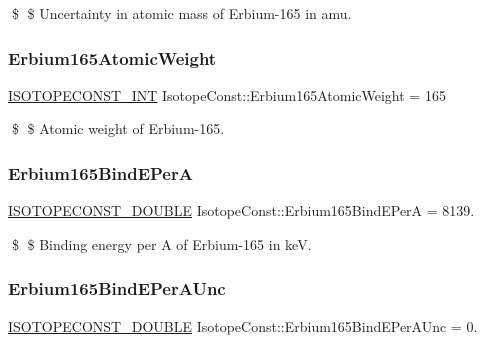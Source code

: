 \$ \$ Uncertainty in atomic mass of Erbium-\/165 in amu. \mbox{\label{group___isotope_const-_erbium-_er165_gadcf315375c63e2ed3c7d562bd5bca902}} 
\subsubsection{\texorpdfstring{Erbium165\+Atomic\+Weight}{Erbium165AtomicWeight}}
{\footnotesize\ttfamily \mbox{\hyperlink{group___isotope_const-_macros_ga5f18360b3e99483a35c32d789e62621c}{I\+S\+O\+T\+O\+P\+E\+C\+O\+N\+S\+T\+\_\+\+I\+NT}} Isotope\+Const\+::\+Erbium165\+Atomic\+Weight = 165}

\$ \$ Atomic weight of Erbium-\/165. \mbox{\label{group___isotope_const-_erbium-_er165_gae482f8321cd73b9d0878221c4cbd75b3}} 
\subsubsection{\texorpdfstring{Erbium165\+Bind\+E\+PerA}{Erbium165BindEPerA}}
{\footnotesize\ttfamily \mbox{\hyperlink{group___isotope_const-_macros_ga8f45a7272ce02c0b4c65c44636ed719a}{I\+S\+O\+T\+O\+P\+E\+C\+O\+N\+S\+T\+\_\+\+D\+O\+U\+B\+LE}} Isotope\+Const\+::\+Erbium165\+Bind\+E\+PerA = 8139.}

\$ \$ Binding energy per A of Erbium-\/165 in keV. \mbox{\label{group___isotope_const-_erbium-_er165_ga83fca8da271a85facda084f243e33fc5}} 
\subsubsection{\texorpdfstring{Erbium165\+Bind\+E\+Per\+A\+Unc}{Erbium165BindEPerAUnc}}
{\footnotesize\ttfamily \mbox{\hyperlink{group___isotope_const-_macros_ga8f45a7272ce02c0b4c65c44636ed719a}{I\+S\+O\+T\+O\+P\+E\+C\+O\+N\+S\+T\+\_\+\+D\+O\+U\+B\+LE}} Isotope\+Const\+::\+Erbium165\+Bind\+E\+Per\+A\+Unc = 0.}

